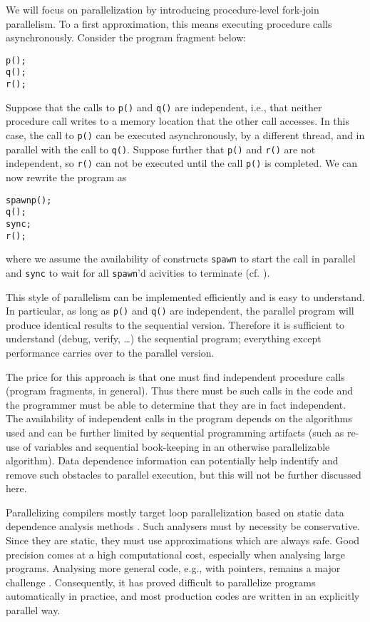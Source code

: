 \documentclass{acm_proc_article-sp}
\begin{document}
We will focus on parallelization by introducing procedure-level
fork-join parallelism.  To a first approximation, this means executing
procedure calls asynchronously.  Consider the program fragment below:
\begin{alltt}
   p();
   q();
   r();
\end{alltt}
Suppose that the calls to {\tt p()} and {\tt q()} are independent,
i.e., that neither procedure call writes to a memory location that the
other call accesses.  In this case, the call to {\tt p()} can be
executed asynchronously, by a different thread, and in parallel with
the call to {\tt q()}.  Suppose further that {\tt p()} and {\tt r()}
are not independent, so {\tt r()} can not be executed until the call
{\tt p()} is completed.  We can now rewrite the program as
\begin{alltt}
   spawn p();
   q();
   sync;
   r();
\end{alltt}
where we assume the availability of constructs {\tt spawn} to start
the call in parallel and {\tt sync} to wait for all {\tt spawn}'d
acivities to terminate (cf. \cite{BJKLR96,frigo98implementation}).

This style of parallelism can be implemented efficiently and is easy
to understand.  In particular, as long as {\tt p()} and {\tt q()} are
independent, the parallel program will produce identical results to
the sequential version.  Therefore it is sufficient to understand
(debug, verify, \ldots) the sequential program; everything except
performance carries over to the parallel version.

The price for this approach is that one must find independent
procedure calls (program fragments, in general).  Thus there must be
such calls in the code and the programmer must be able to determine
that they are in fact independent.  The availability of independent
calls in the program depends on the algorithms used and can be further
limited by sequential programming artifacts (such as re-use of
variables and sequential book-keeping in an otherwise parallelizable
algorithm).  Data dependence information can potentially help
indentify and remove such obstacles to parallel execution, but this
will not be further discussed here.

Parallelizing compilers mostly target loop parallelization based on
static data dependence analysis methods \cite{}.  Such analysers must
by necessity be conservative.  Since they are static, they must use
approximations which are always safe.  Good precision comes at a high
computational cost, especially when analysing large programs.
Analysing more general code, e.g., with pointers, remains a major
challenge \cite{}.  Consequently, it has proved difficult to
parallelize programs automatically in practice, and most production
codes are written in an explicitly parallel way.
\end{document}
